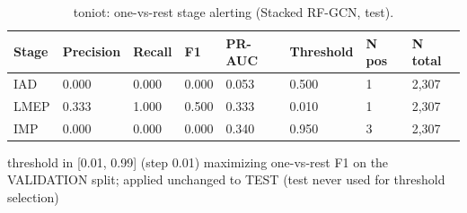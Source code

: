 \begin{table}[t]
\centering
\caption{toniot: one-vs-rest stage alerting (Stacked RF-GCN, test).}
\label{tab:toniot_ovr_alerting}
\begin{tabular}{llllllll}
\toprule
Stage & Precision & Recall & F1 & PR-AUC & Threshold & N pos & N total \\
\midrule
IAD & 0.000 & 0.000 & 0.000 & 0.053 & 0.500 & 1 & 2,307 \\
LMEP & 0.333 & 1.000 & 0.500 & 0.333 & 0.010 & 1 & 2,307 \\
IMP & 0.000 & 0.000 & 0.000 & 0.340 & 0.950 & 3 & 2,307 \\
\bottomrule
\end{tabular}
\vspace{2pt}
\parbox{\linewidth}{\footnotesize threshold in [0.01, 0.99] (step 0.01) maximizing one-vs-rest F1 on the VALIDATION split; applied unchanged to TEST (test never used for threshold selection)}
\end{table}
